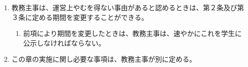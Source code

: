 \begin{enumerate}[label=第\arabic*条　]
\begin{enumerate}[label=\arabic*　,start=2,leftmargin=*]
      \item 最初の学期の開始時期その他必要な事項は、教務主事が別に定める。
    \end{enumerate}
  \item 教務主事は、運営上やむを得ない事由があると認めるときは、第２条及び第３条に定める期間を変更することができる。
    \begin{enumerate}[label=\arabic*　,start=2,leftmargin=*]
      \item 前項により期間を変更したときは、教務主事は、速やかにこれを学生に公示しなければならない。
    \end{enumerate}
  \item この章の実施に関し必要な事項は、教務主事が別に定める。
\end{enumerate}
